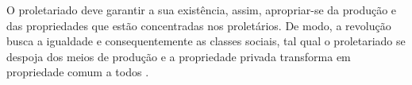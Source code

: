 O proletariado deve garantir a sua existência, assim, apropriar-se da produção e das propriedades que estão concentradas nos proletários. 
De modo, a revolução busca a igualdade e consequentemente as classes sociais, tal qual o proletariado se despoja dos meios de produção e a propriedade privada transforma em propriedade comum a todos \cite{marx_ideologia}.


